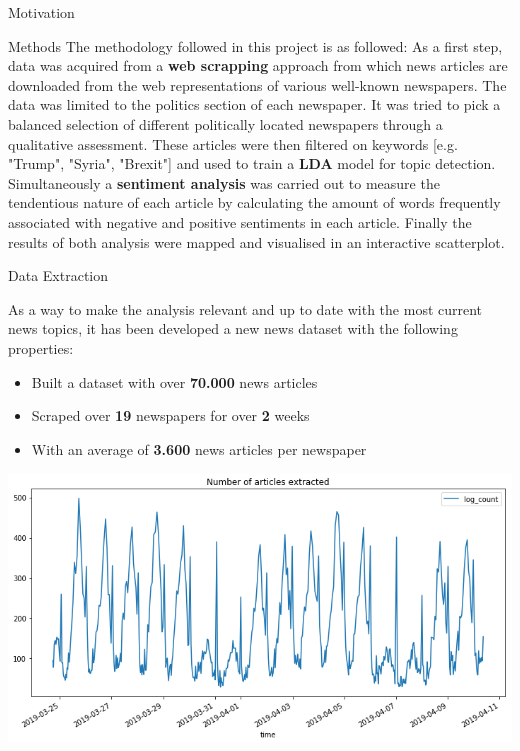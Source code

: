\documentclass[final]{beamer}
\newlength{\onecolwid}
\begin{document}
\begin{frame}[t]
\begin{columns}[t]
\begin{column}{\onecolwid}
\begin{block}{Motivation}
\end{block}


\begin{block}{Methods}
    The methodology followed in this project is as followed: As a first step, data was acquired from a \textbf{web scrapping} approach from which news articles are downloaded from the web representations of various well-known newspapers. The data was limited to the politics section of each newspaper. It was tried to pick a balanced selection of different politically located newspapers through a qualitative assessment.
    These articles were then filtered on keywords [e.g. "Trump", "Syria", "Brexit"] and used to train a \textbf{LDA} model for topic detection. Simultaneously a \textbf{sentiment analysis} was carried out to measure the tendentious nature of each article by calculating the amount of words frequently associated with negative and positive sentiments in each article.
    Finally the results of both analysis were mapped and visualised in an interactive scatterplot. 
\end{block}
    


\begin{block}{Data Extraction}

    As a way to make the analysis relevant and up to date with the most current news topics,
    it has been developed a new news dataset with the following properties:

    \begin{itemize}
        \item Built a dataset with over \textbf{70.000} news articles
        \item Scraped over \textbf{19} newspapers for over \textbf{2} weeks
        \item With an average of \textbf{3.600} news articles per newspaper
    \end{itemize}

    \hfill\includegraphics{log_extraction.png}\hspace*{\fill}


\end{block}
\end{column}
\end{columns}
\end{frame}
\end{document}
